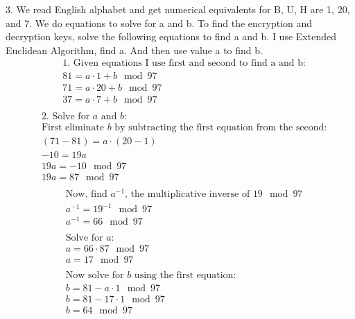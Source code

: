 \documentclass{article}
\begin{document}
3. We read English alphabet and get numerical equivalents for B, U, H are 1, 20, and 7. We do equations to solve for a and b.
To find the encryption and decryption keys, solve the following equations to find a and b. I use Extended Euclidean Algorithm, find a.
And then use value a to find b.
\begin{align*}
  &\text{1. Given equations I use first and second to find a and b:} \\
  &81 = a \cdot 1 + b \mod 97 \\
  &71 = a \cdot 20 + b \mod 97 \\
  &37 = a \cdot 7 + b \mod 97 \\
\end{align*}
\begin{align*}
  &\text{2. Solve for } a \text{ and } b: \\
  &\text{First eliminate } b \text{ by subtracting the first equation from the second:} \\
  &(71 - 81) = a \cdot (20 - 1) \\
  &-10 = 19a \\
  &19a = -10 \mod 97 \\
  &19a = 87 \mod 97 \\
\end{align*}
\begin{align*}
  &\text{Now, find } a^{-1} \text{, the multiplicative inverse of } 19 \mod 97 \\
  &a^{-1} = 19^{-1} \mod 97 \\
  &a^{-1} = 66 \mod 97 \\
  & \\
  &\text{Solve for } a: \\
  &a = 66 \cdot 87 \mod 97 \\
  &a = 17 \mod 97 \\
  & \\
  &\text{Now solve for } b \text{ using the first equation:} \\
  &b = 81 - a \cdot 1 \mod 97 \\
  &b = 81 - 17 \cdot 1 \mod 97 \\
  &b = 64 \mod 97 \\
\end{align*}
\end{document}
